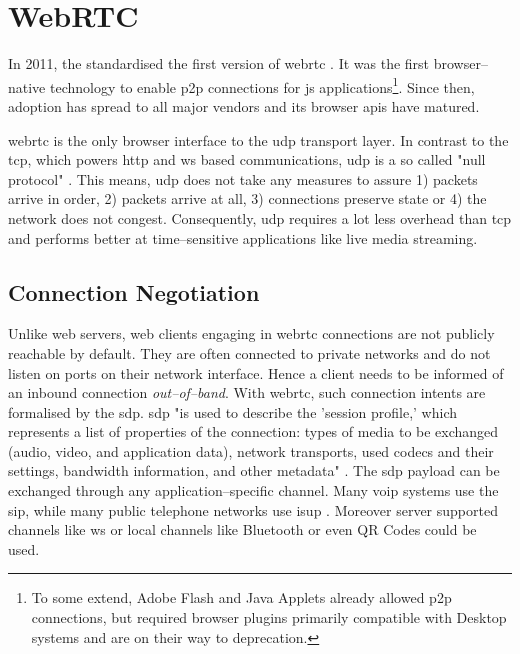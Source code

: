 \section{WebRTC}\label{sec:webrtc}

In 2011, the  standardised the first version of \gls{webrtc} \cite{webrtc-w3c}. It was the first browser–native technology to enable \gls{p2p} connections for \gls{js} applications\footnote{To some extend, Adobe Flash and Java Applets already allowed \gls{p2p} connections, but required browser plugins primarily compatible with Desktop systems and are on their way to deprecation.}. Since then, adoption has spread to all major vendors \cite{webrtc-browser-compat} and its browser \glspl{api} have matured.

\gls{webrtc} is the only browser interface to the \gls{udp} transport layer. In contrast to the \gls{tcp}, which powers \gls{http} and \gls{ws} based communications, \gls{udp} is a so called "null protocol" \cite[p. 36]{high-performance-browser-networking}. This means, \gls{udp} does not take any measures to assure 1) packets arrive in order, 2) packets arrive at all, 3) connections preserve state or 4) the network does not congest. Consequently, \gls{udp} requires a lot less overhead than \gls{tcp} and performs better at time–sensitive applications like live media streaming.

\subsection{Connection Negotiation}\label{sec:webrtc-con-negotiation}
Unlike web servers, web clients engaging in \gls{webrtc} connections are not publicly reachable by default. They are often connected to private networks and do not listen on ports on their network interface.
Hence a client needs to be informed of an inbound connection \textit{out–of–band}. With \gls{webrtc}, such connection intents are formalised by the \gls{sdp}. \gls{sdp} "is used to describe the 'session profile,' which represents a list of properties of the connection: types of media to be exchanged (audio, video, and application data), network transports, used codecs and their settings, bandwidth information, and other metadata" \cite[p. 323]{high-performance-browser-networking}.
The \gls{sdp} payload \cite[\S5]{sdp-rfc} can be exchanged through any application–specific channel. Many \gls{voip} systems use the \gls{sip}, while many public telephone networks use \gls{isup} \cite[p. 321]{high-performance-browser-networking}. Moreover server supported channels like \gls{ws} or local channels like Bluetooth or even QR Codes could be used.

